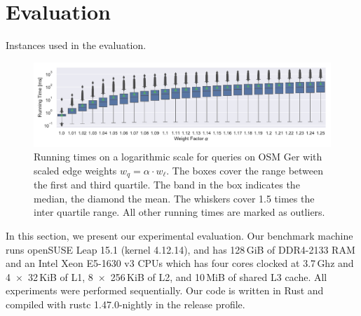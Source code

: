 \documentclass[letterpaper]{article} %
\begin{document}
\section{Evaluation}

\label{sec:experiments}

\begin{table}
\centering
\caption{Instances used in the evaluation.}\label{tab:graphs}

\end{table}

\begin{figure}
\centering
\includegraphics[width=\textwidth]{fig/scaled_weights.pdf}
\caption{
Running times on a logarithmic scale for queries on OSM Ger with scaled edge weights $w_q = \alpha \cdot w_\ell$.
The boxes cover the range between the first and third quartile.
The band in the box indicates the median, the diamond the mean.
The whiskers cover 1.5 times the inter quartile range.
All other running times are marked as outliers.
}\label{fig:scaled_weights}
\end{figure}

In this section, we present our experimental evaluation.
Our benchmark machine runs openSUSE Leap 15.1 (kernel 4.12.14), and has 128\,GiB of DDR4-2133 RAM and an Intel Xeon E5-1630 v3 CPUs which has four cores clocked at 3.7\,Ghz and 4~$\times$~32\,KiB of L1, 8~$\times$~256\,KiB of L2, and 10\,MiB of shared L3 cache.
All experiments were performed sequentially.
Our code is written in Rust and compiled with rustc 1.47.0-nightly in the release profile. %
\end{document}
